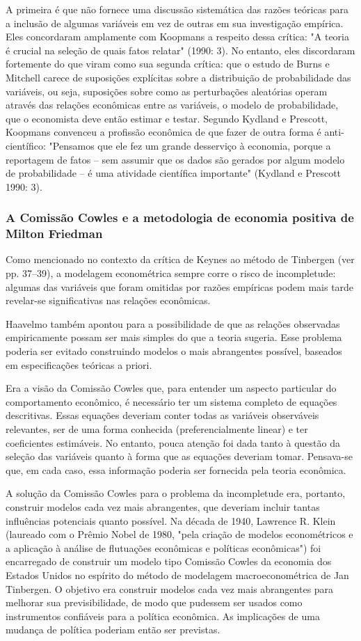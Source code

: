 \documentclass[12pt]{article}
\begin{document}
A primeira é que não fornece uma discussão sistemática das razões teóricas para a inclusão de algumas variáveis em vez de outras em sua investigação empírica. Eles concordaram amplamente com Koopmans a respeito dessa crítica: "A teoria é crucial na seleção de quais fatos relatar" (1990: 3). No entanto, eles discordaram fortemente do que viram como sua segunda crítica: que o estudo de Burns e Mitchell carece de suposições explícitas sobre a distribuição de probabilidade das variáveis, ou seja, suposições sobre como as perturbações aleatórias operam através das relações econômicas entre as variáveis, o modelo de probabilidade, que o economista deve então estimar e testar. Segundo Kydland e Prescott, Koopmans convenceu a profissão econômica de que fazer de outra forma é anti-científico: "Pensamos que ele fez um grande desserviço à economia, porque a reportagem de fatos – sem assumir que os dados são gerados por algum modelo de probabilidade – é uma atividade científica importante" (Kydland e Prescott 1990: 3).

\subsubsection{\textbf{A Comissão Cowles e a metodologia de economia positiva de Milton Friedman}}
Como mencionado no contexto da crítica de Keynes ao método de Tinbergen (ver pp. 37–39), a modelagem econométrica sempre corre o risco de incompletude: algumas das variáveis que foram omitidas por razões empíricas podem mais tarde revelar-se significativas nas relações econômicas.

Haavelmo também apontou para a possibilidade de que as relações observadas empiricamente possam ser mais simples do que a teoria sugeria. Esse problema poderia ser evitado construindo modelos o mais abrangentes possível, baseados em especificações teóricas a priori.

Era a visão da Comissão Cowles que, para entender um aspecto particular do comportamento econômico, é necessário ter um sistema completo de equações descritivas. Essas equações deveriam conter todas as variáveis observáveis relevantes, ser de uma forma conhecida (preferencialmente linear) e ter coeficientes estimáveis. No entanto, pouca atenção foi dada tanto à questão da seleção das variáveis quanto à forma que as equações deveriam tomar. Pensava-se que, em cada caso, essa informação poderia ser fornecida pela teoria econômica.

A solução da Comissão Cowles para o problema da incompletude era, portanto, construir modelos cada vez mais abrangentes, que deveriam incluir tantas influências potenciais quanto possível. Na década de 1940, Lawrence R. Klein (laureado com o Prêmio Nobel de 1980, "pela criação de modelos econométricos e a aplicação à análise de flutuações econômicas e políticas econômicas") foi encarregado de construir um modelo tipo Comissão Cowles da economia dos Estados Unidos no espírito do método de modelagem macroeconométrica de Jan Tinbergen. O objetivo era construir modelos cada vez mais abrangentes para melhorar sua previsibilidade, de modo que pudessem ser usados como instrumentos confiáveis para a política econômica. As implicações de uma mudança de política poderiam então ser previstas.
\end{document}
